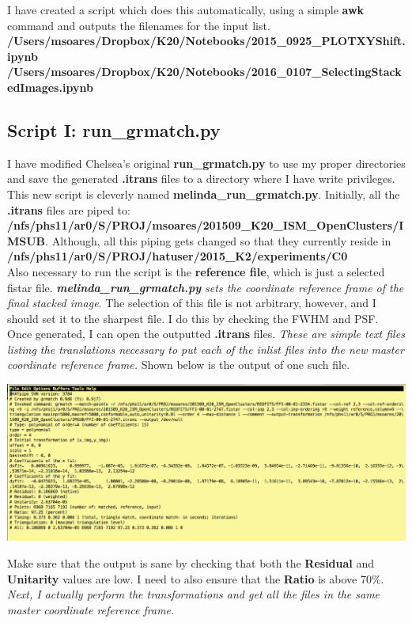 \documentclass[11pt,letterpaper]{book} %
\begin{document}
I have created a script which does this automatically, using a simple \textbf{awk} command and outputs the filenames for the input list.\\ \textbf{/Users/msoares/Dropbox/K20/Notebooks/2015\_0925\_PLOTXYShift.ipynb}  \\ 
\textbf{/Users/msoares/Dropbox/K20/Notebooks/2016\_0107\_SelectingStackedImages.ipynb}

\subsection*{Script I: \textbf{run\_grmatch.py}}
I have modified Chelsea's original \textbf{run\_grmatch.py} to use my proper directories and save the generated \textbf{.itrans} files to a directory where I have write privileges. This new script is cleverly named \textbf{melinda\_run\_grmatch.py}. Initially, all the \textbf{.itrans} files are piped to:\\
\textbf{/nfs/phs11/ar0/S/PROJ/msoares/201509\_K20\_ISM\_OpenClusters/IMSUB}. Although, all this piping gets changed so that they currently reside in \textbf{/nfs/phs11/ar0/S/PROJ/hatuser/2015\_K2/experiments/C0} \\
Also necessary to run the script is the \textbf{reference file}, which is just a selected fistar file. \textit{\textbf{melinda\_run\_grmatch.py} sets the coordinate reference frame of the final stacked image}. The selection of this file is not arbitrary, however, and I should set it to the sharpest file. I do this by checking the FWHM and PSF.
Once generated, I can open the outputted \textbf{.itrans} files. \textit{These are simple text files listing the translations necessary to put each of the inlist files into the new master coordinate reference frame.} 
Shown below is the output of one such file.\\
\begin{center}
\includegraphics[width=\textwidth]{itrans.png}
\end{center}
Make sure that the output is sane by checking that both the \textbf{Residual} and \textbf{Unitarity} values are low. 
I need to also ensure that the \textbf{Ratio} is above 70\%. \\ \textit{Next, I actually perform the transformations and get all the files in the same master coordinate reference frame.} 
\end{document}
